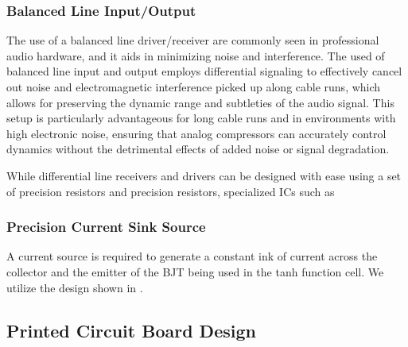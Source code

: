 \documentclass[10pt]{article}
\begin{document}
\begin{multicols*}{2}
\begin{minipage}{\linewidth}
\begin{tikzpicture}[scale = 0.9, transform shape]

                        \end{tikzpicture}

                        \label{fig:pwr-mng}

                    \end{minipage}

                \subsubsection{Balanced Line Input/Output}
                    The use of a balanced line driver/receiver are commonly seen in professional audio hardware, and it aids in minimizing noise and interference. The used of balanced line input and output employs differential signaling to effectively cancel out noise and electromagnetic interference picked up along cable runs, which allows  for preserving the dynamic range and subtleties of the audio signal. This setup is particularly advantageous for long cable runs and in environments with high electronic noise, ensuring that analog compressors can accurately control dynamics without the detrimental effects of added noise or signal degradation.\par
                    While differential line receivers and drivers can be designed with ease using a set of precision resistors and precision resistors, specialized ICs such as 

                \subsubsection{Precision Current Sink Source}
                    A current source is required to generate a constant ink of current across the collector and the emitter of the BJT being used in the tanh function cell.
                    We utilize the design shown in \cite{ti-sink-source}.

            \subsection{Printed Circuit Board Design}


\end{multicols*}
\end{document}
